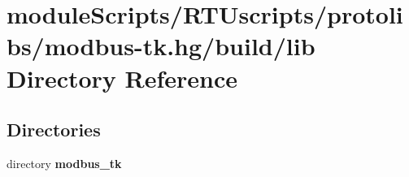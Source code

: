 \section{module\+Scripts/\+R\+T\+Uscripts/protolibs/modbus-\/tk.hg/build/lib Directory Reference}
\label{dir_4e336c493dc41099e252f5e8b8169f7c}
\subsection*{Directories}
\begin{DoxyCompactItemize}
\item 
directory {\bf modbus\+\_\+tk}
\end{DoxyCompactItemize}
